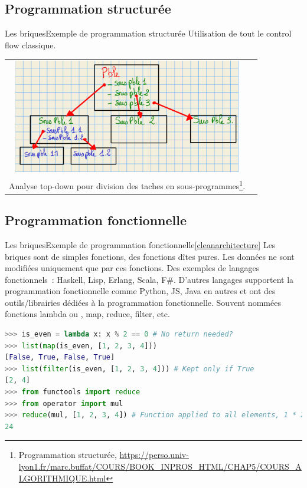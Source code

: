 \documentclass{beamer}
\begin{document}
    \subsection{Programmation structurée}\label{subsec:briques-struct}
    \begin{frame}{Les briques}{Exemple de programmation structurée}
        Utilisation de tout le control flow classique.
        \bigbreak
        \centering
        \begin{tabular}{cc}
            \includegraphics[width=10cm]{image/analyse-topdown-prog-struc}                                                                                                                                        \\
            Analyse top-down pour division des taches en sous-programmes\footnote{Programmation structurée, \url{https://perso.univ-lyon1.fr/marc.buffat/COURS/BOOK_INPROS_HTML/CHAP5/COURS_ALGORITHMIQUE.html}}.                     \\
        \end{tabular}
    \end{frame}

    \subsection{Programmation fonctionnelle}\label{subsec:briques-fonc}
    \begin{frame}[fragile]{Les briques}{Exemple de programmation fonctionnelle\cref{cleanarchitecture}}
        Les briques sont de simples fonctions, des fonctions dîtes pures.
        Les données ne sont modifiées uniquement que par ces fonctions.
        \bigbreak
        Des exemples de langages fonctionnels~: Haskell, Lisp, Erlang, Scala, F\#.
        \bigbreak
        D'autres langages supportent la programmation fonctionnelle comme Python, JS, Java en autres et ont des outils/librairies dédiées à la programmation fonctionnelle.
        Souvent nommées fonctions lambda ou , map, reduce, filter, etc.
        \begin{lstlisting}[language=python]
>>> is_even = lambda x: x % 2 == 0 # No return needed?
>>> list(map(is_even, [1, 2, 3, 4]))
[False, True, False, True]
>>> list(filter(is_even, [1, 2, 3, 4])) # Kept only if True
[2, 4]
>>> from functools import reduce
>>> from operator import mul
>>> reduce(mul, [1, 2, 3, 4]) # Function applied to all elements, 1 * 2 * 3 * 4
24
        \end{lstlisting}
    \end{frame}
\end{document}
